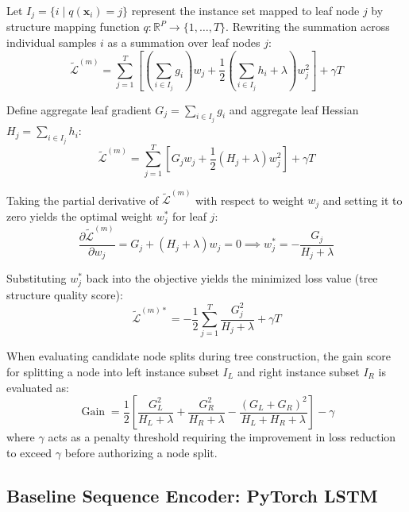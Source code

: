Let $I_j = \{i \mid q(\mathbf{x}_i) = j\}$ represent the instance set mapped to leaf node $j$ by structure mapping function $q: \mathbb{R}^P \to \{1, \dots, T\}$. Rewriting the summation across individual samples $i$ as a summation over leaf nodes $j$:
\begin{equation}
\tilde{\mathcal{L}}^{(m)} = \sum_{j=1}^T \left[ \left( \sum_{i \in I_j} g_i \right) w_j + \frac{1}{2} \left( \sum_{i \in I_j} h_i + \lambda \right) w_j^2 \right] + \gamma T
\label{eq:ch4_xgb_grouped_obj}
\end{equation}

Define aggregate leaf gradient $G_j = \sum_{i \in I_j} g_i$ and aggregate leaf Hessian $H_j = \sum_{i \in I_j} h_i$:
\begin{equation}
\tilde{\mathcal{L}}^{(m)} = \sum_{j=1}^T \left[ G_j w_j + \frac{1}{2} (H_j + \lambda) w_j^2 \right] + \gamma T
\end{equation}

Taking the partial derivative of $\tilde{\mathcal{L}}^{(m)}$ with respect to weight $w_j$ and setting it to zero yields the optimal weight $w_j^*$ for leaf $j$:
\begin{equation}
\frac{\partial \tilde{\mathcal{L}}^{(m)}}{\partial w_j} = G_j + (H_j + \lambda) w_j = 0 \implies w_j^* = -\frac{G_j}{H_j + \lambda}
\label{eq:ch4_xgb_optimal_w}
\end{equation}

Substituting $w_j^*$ back into the objective yields the minimized loss value (tree structure quality score):
\begin{equation}
\tilde{\mathcal{L}}^{(m)*} = -\frac{1}{2} \sum_{j=1}^T \frac{G_j^2}{H_j + \lambda} + \gamma T
\label{eq:ch4_xgb_structure_score}
\end{equation}

When evaluating candidate node splits during tree construction, the gain score for splitting a node into left instance subset $I_L$ and right instance subset $I_R$ is evaluated as:
\begin{equation}
\operatorname{Gain} = \frac{1}{2} \left[ \frac{G_L^2}{H_L + \lambda} + \frac{G_R^2}{H_R + \lambda} - \frac{(G_L + G_R)^2}{H_L + H_R + \lambda} \right] - \gamma
\label{eq:ch4_xgb_gain}
\end{equation}
where $\gamma$ acts as a penalty threshold requiring the improvement in loss reduction to exceed $\gamma$ before authorizing a node split.

\subsection{Baseline Sequence Encoder: PyTorch LSTM}
\label{subsec:ch4_lstm}

